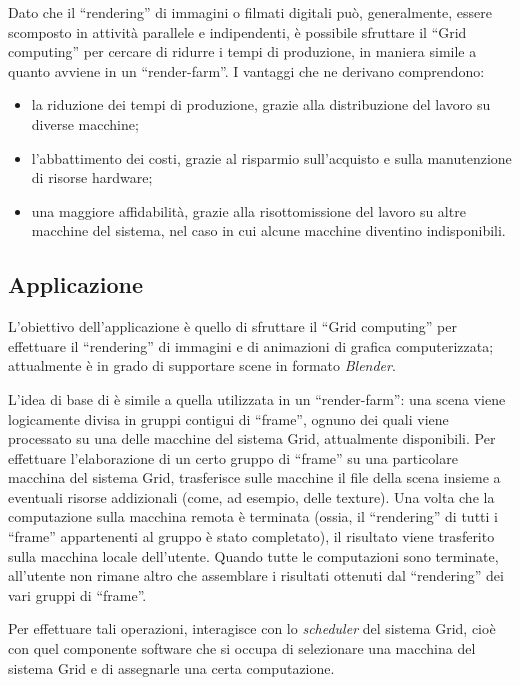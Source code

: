 Dato che il ``rendering'' di immagini o filmati digitali pu\`o, generalmente, essere scomposto in attivit\`a parallele e indipendenti, \`e possibile sfruttare il ``Grid computing'' per cercare di ridurre i tempi di produzione, in maniera simile a quanto avviene in un ``render-farm''.
I vantaggi che ne derivano comprendono:
\begin{itemize}
\item la riduzione dei tempi di produzione, grazie alla distribuzione del lavoro su diverse macchine;
\item l'abbattimento dei costi, grazie al risparmio sull'acquisto e sulla manutenzione di risorse hardware;
\item una maggiore affidabilit\`a, grazie alla risottomissione del lavoro su altre macchine del sistema, nel caso in cui alcune macchine diventino indisponibili.
\end{itemize}

\subsection{Applicazione \mgTheApp{}} \label{ssec:intro-theapp}

L'obiettivo dell'applicazione \mgTheApp{} \`e quello di sfruttare il ``Grid computing'' per effettuare il ``rendering'' di immagini e di animazioni di grafica computerizzata; attualmente \mgTheApp{} \`e in grado di supportare scene in formato \emph{Blender}.

L'idea di base di \mgTheApp{} \`e simile a quella utilizzata in un ``render-farm'': una scena viene logicamente divisa in gruppi contigui di ``frame'', ognuno dei quali viene processato su una delle macchine del sistema Grid, attualmente disponibili.
Per effettuare l'elaborazione di un certo gruppo di ``frame'' su una particolare macchina del sistema Grid, \mgTheApp{} trasferisce sulle macchine il file della scena insieme a eventuali risorse addizionali (come, ad esempio, delle texture).
Una volta che la computazione sulla macchina remota \`e terminata (ossia, il ``rendering'' di tutti i ``frame'' appartenenti al gruppo \`e stato completato), il risultato viene trasferito sulla macchina locale dell'utente.
Quando tutte le computazioni sono terminate, all'utente non rimane altro che assemblare i risultati ottenuti dal ``rendering'' dei vari gruppi di ``frame''.

Per effettuare tali operazioni, \mgTheApp{} interagisce con lo \emph{scheduler} del sistema Grid, cio\`e con quel componente software che si occupa di selezionare una macchina del sistema Grid e di assegnarle una certa computazione.


